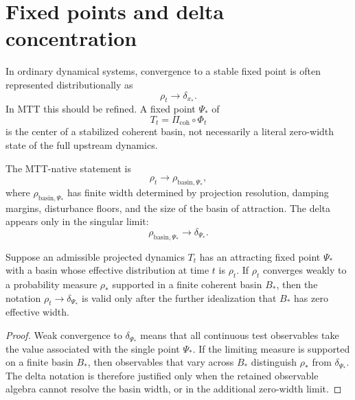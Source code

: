 \documentclass[11pt]{article}
\begin{document}
\section{Fixed points and delta concentration}

In ordinary dynamical systems, convergence to a stable fixed point is often represented
distributionally as
\begin{equation}
\rho_t\to \delta_{x_\ast}.
\end{equation}
In MTT this should be refined.  A fixed point \(\Psi_\ast\) of
\begin{equation}
T_t=\Pi_{\mathrm{coh}}\circ\Phi_t
\end{equation}
is the center of a stabilized coherent basin, not necessarily a literal zero-width state of the
full upstream dynamics.

The MTT-native statement is
\begin{equation}
\rho_t\to \rho_{\mathrm{basin},\Psi_\ast},
\end{equation}
where \(\rho_{\mathrm{basin},\Psi_\ast}\) has finite width determined by projection resolution,
damping margins, disturbance floors, and the size of the basin of attraction.  The delta
appears only in the singular limit:
\begin{equation}
\rho_{\mathrm{basin},\Psi_\ast}\to\delta_{\Psi_\ast}.
\end{equation}

\begin{proposition}\label{prop:fixed-delta}
Suppose an admissible projected dynamics \(T_t\) has an attracting fixed point \(\Psi_\ast\)
with a basin whose effective distribution at time \(t\) is \(\rho_t\). If \(\rho_t\) converges
weakly to a probability measure \(\rho_\ast\) supported in a finite coherent basin
\(B_\ast\), then the notation \(\rho_t\to\delta_{\Psi_\ast}\) is valid only after the further
idealization that \(B_\ast\) has zero effective width.
\end{proposition}

\begin{proof}
Weak convergence to \(\delta_{\Psi_\ast}\) means that all continuous test observables take the
value associated with the single point \(\Psi_\ast\).  If the limiting measure is supported on
a finite basin \(B_\ast\), then observables that vary across \(B_\ast\) distinguish
\(\rho_\ast\) from \(\delta_{\Psi_\ast}\).  The delta notation is therefore justified only when
the retained observable algebra cannot resolve the basin width, or in the additional
zero-width limit.
\end{proof}
\end{document}
